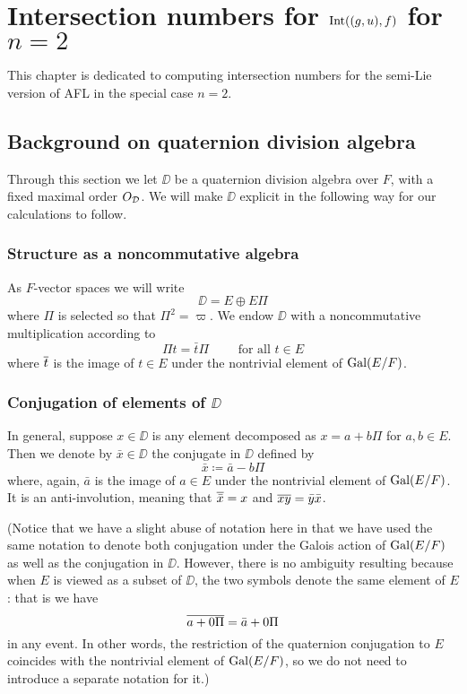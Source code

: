 \section{Intersection numbers for $\operatorname{Int}((g,u), f)$ for $n = 2$}
\label{ch:jiao}
This chapter is dedicated to computing intersection numbers
for the semi-Lie version of AFL in the special case $n = 2$.

\subsection{Background on quaternion division algebra}
Through this section we let $\DD$ be a quaternion division algebra over $F$,
with a fixed maximal order $O_\mathcal D$.
We will make $\DD$ explicit in the following way for our calculations to follow.

\subsubsection{Structure as a noncommutative algebra}
As $F$-vector spaces we will write
\[ \DD = E \oplus E \Pi \]
where $\Pi$ is selected so that $\Pi^2 = \varpi$.
We endow $\DD$ with a noncommutative multiplication according to
\[ \Pi t = \bar t \Pi \qquad \text{ for all } t \in E \]
where $\overline{t}$ is the image of $t \in E$ under the nontrivial element of $\operatorname{Gal}(E/F)$.

\subsubsection{Conjugation of elements of $\DD$}
In general, suppose $x \in \DD$ is any element
decomposed as $x = a + b \Pi$ for $a,b \in E$.
Then we denote by $\bar x \in \DD$ the conjugate in $\DD$ defined by
\[ \bar x \coloneqq \bar a - b \Pi \]
where, again, $\bar a$ is the image of $a \in E$ under the nontrivial element of $\operatorname{Gal}(E/F)$.
It is an anti-involution, meaning that $\overline{\bar x} = x$ and $\overline{xy} = \bar y \bar x$.

(Notice that we have a slight abuse of notation here in that we have
used the same notation to denote both conjugation under the Galois action of $\operatorname{Gal}(E/F)$
as well as the conjugation in $\DD$.
However, there is no ambiguity resulting because when $E$ is viewed as a subset of $\DD$,
the two symbols denote the same element of $E$:
that is we have
\[ \overline{a + 0 \Pi} = \bar{a} + 0 \Pi \]
in any event.
In other words, the restriction of the quaternion conjugation to $E$
coincides with the nontrivial element of $\operatorname{Gal}(E/F)$,
so we do not need to introduce a separate notation for it.)

